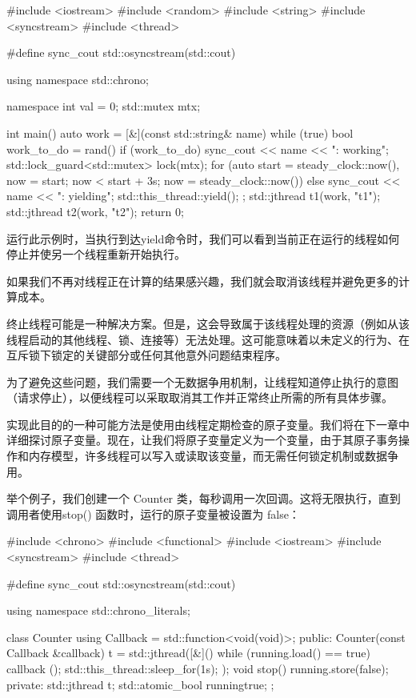 \begin{cpp}
#include <iostream>
#include <random>
#include <string>
#include <syncstream>
#include <thread>

#define sync_cout std::osyncstream(std::cout)

using namespace std::chrono;

namespace {
    int val = 0;
    std::mutex mtx;
}

int main() {
    auto work = [&](const std::string& name) {
        while (true) {
            bool work_to_do = rand() %
            if (work_to_do) {
                sync_cout << name << ": working\n";
                std::lock_guard<std::mutex> lock(mtx);
                for (auto start = steady_clock::now(),
                          now = start;
                          now < start + 3s;
                          now = steady_clock::now()) {
                }
            } else {
                sync_cout << name << ": yielding\n";
                std::this_thread::yield();
            }
        }
    };
    std::jthread t1(work, "t1");
    std::jthread t2(work, "t2");
    return 0;
}
\end{cpp}

运行此示例时，当执行到达yield命令时，我们可以看到当前正在运行的线程如何停止并使另一个线程重新开始执行。


如果我们不再对线程正在计算的结果感兴趣，我们就会取消该线程并避免更多的计算成本。

终止线程可能是一种解决方案。但是，这会导致属于该线程处理的资源（例如从该线程启动的其他线程、锁、连接等）无法处理。这可能意味着以未定义的行为、在互斥锁下锁定的关键部分或任何其他意外问题结束程序。

为了避免这些问题，我们需要一个无数据争用机制，让线程知道停止执行的意图（请求停止），以便线程可以采取取消其工作并正常终止所需的所有具体步骤。

实现此目的的一种可能方法是使用由线程定期检查的原子变量。我们将在下一章中详细探讨原子变量。现在，让我们将原子变量定义为一个变量，由于其原子事务操作和内存模型，许多线程可以写入或读取该变量，而无需任何锁定机制或数据争用。

举个例子，我们创建一个 Counter 类，每秒调用一次回调。这将无限执行，直到调用者使用stop() 函数时，运行的原子变量被设置为 false：

\begin{cpp}
#include <chrono>
#include <functional>
#include <iostream>
#include <syncstream>
#include <thread>

#define sync_cout std::osyncstream(std::cout)

using namespace std::chrono_literals;

class Counter {
    using Callback = std::function<void(void)>;
public:
    Counter(const Callback &callback) {
        t = std::jthread([&]() {
            while (running.load() == true) {
                callback ();
                std::this_thread::sleep_for(1s);
            }
        });
    }
    void stop() { running.store(false); }
private:
    std::jthread t;
    std::atomic_bool running{true};
};
\end{cpp}

